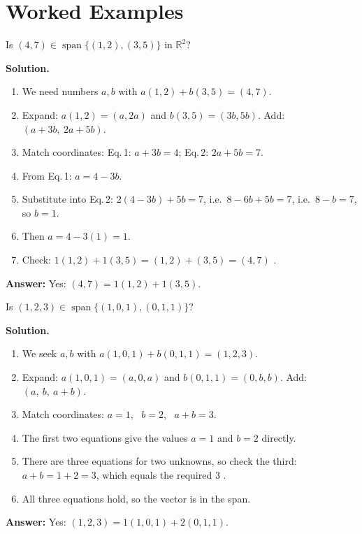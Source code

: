 \documentclass[11pt]{article}
\begin{document}
\section*{\large\color{ink} Worked Examples}
\begin{tcolorbox}[colback=white,colframe=ink!60,title={\bfseries Example 1 \textperiodcentered\ Membership in a span}]Is $(4,7)\in\operatorname{span}\{(1,2),(3,5)\}$ in $\mathbb{R}^{2}$?
\par\smallskip
\textbf{Solution.} \begin{enumerate}[leftmargin=1.6em,itemsep=1pt,topsep=2pt,label=\arabic*.]\item We need numbers $a,b$ with $a(1,2)+b(3,5)=(4,7)$.
\item Expand: $a(1,2)=(a,2a)$ and $b(3,5)=(3b,5b)$. Add: $(a+3b,\ 2a+5b)$.
\item Match coordinates: Eq.\,1: $a+3b=4$; Eq.\,2: $2a+5b=7$.
\item From Eq.\,1: $a=4-3b$.
\item Substitute into Eq.\,2: $2(4-3b)+5b=7$, i.e.\ $8-6b+5b=7$, i.e.\ $8-b=7$, so $b=1$.
\item Then $a=4-3(1)=1$.
\item Check: $1(1,2)+1(3,5)=(1,2)+(3,5)=(4,7)$ \checkmark.
\end{enumerate}\textbf{Answer:} Yes: $(4,7)=1(1,2)+1(3,5)$.
\end{tcolorbox}
\begin{tcolorbox}[colback=white,colframe=ink!60,title={\bfseries Example 2 \textperiodcentered\ Membership (positive)}]Is $(1,2,3)\in\operatorname{span}\{(1,0,1),(0,1,1)\}$?
\par\smallskip
\textbf{Solution.} \begin{enumerate}[leftmargin=1.6em,itemsep=1pt,topsep=2pt,label=\arabic*.]\item We seek $a,b$ with $a(1,0,1)+b(0,1,1)=(1,2,3)$.
\item Expand: $a(1,0,1)=(a,0,a)$ and $b(0,1,1)=(0,b,b)$. Add: $(a,\ b,\ a+b)$.
\item Match coordinates: $a=1$, \ $b=2$, \ $a+b=3$.
\item The first two equations give the values $a=1$ and $b=2$ directly.
\item There are three equations for two unknowns, so check the third: $a+b=1+2=3$, which equals the required $3$ \checkmark.
\item All three equations hold, so the vector is in the span.
\end{enumerate}\textbf{Answer:} Yes: $(1,2,3)=1(1,0,1)+2(0,1,1)$.
\end{tcolorbox}
\end{document}
